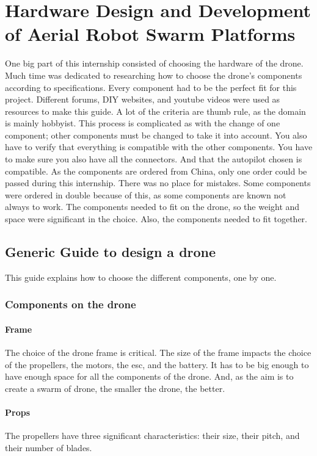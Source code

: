 \chapter{Hardware Design and Development of Aerial Robot Swarm Platforms}

One big part of this internship consisted of choosing the hardware of the drone.
Much time was dedicated to researching how to choose the drone's components according to specifications.
Every component had to be the perfect fit for this project.
Different forums, DIY websites, and youtube videos were used as resources to make this guide.
A lot of the criteria are thumb rule, as the domain is mainly hobbyist.
This process is complicated as with the change of one component; other components must be changed to take it into account.
You also have to verify that everything is compatible with the other components.
You have to make sure you also have all the connectors.
And that the autopilot chosen is compatible.
As the components are ordered from China, only one order could be passed during this internship.
There was no place for mistakes.
Some components were ordered in double because of this, as some components are known not always to work.
The components needed to fit on the drone, so the weight and space were significant in the choice.
Also, the components needed to fit together.

\section{Generic Guide to design a drone}

This guide explains how to choose the different components, one by one.

\subsection{Components on the drone}

\subsubsection{Frame}
The choice of the drone frame is critical.
The size of the frame impacts the choice of the propellers, the motors, the \acrshort{esc}, and the battery.
It has to be big enough to have enough space for all the components of the drone.
And, as the aim is to create a swarm of drone, the smaller the drone, the better.

\subsubsection{Props}
The propellers have three significant characteristics: their size, their pitch, and their number of blades.

